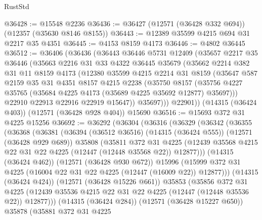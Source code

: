 \begin{lexlean}{RustStd}
\begin{coremodule}
@36428 := @15548 @2236
@36436 := @36427 (@12571 (@36428 @332 @694)) (@12357 (@35630 @8146 @8155))
@36443 := @12389 @35599 @4215 @694 @31 @2217 @35 @4351
@36445 := @4153 @8159 @4173
@36446 := @4802 @36445
@36512 := @36406
    (@36436
      (@36443
        @36446
        @5731
        @12409
        (@35657
          @2217
          @35
          @36446
          (@35663
            @2216
            @31
            @33
            @4322
            @36445
            @35679
            (@35662
              @2214
              @382
              @31
              @11
              @8159
              @4173
              (@12380
                @35599
                @4215
                @2214
                @31
                @8159
                (@35647
                  @587
                  @2159
                  @35
                  @31
                  @4351
                  @8157
                  @4215
                  @2238
                  (@35750
                    @8157
                    (@35756 @4227 @35765 (@35684 @4225 @4173 (@35689 @4225 @35692 @12877) @35697)))
                  @22910
                  @22913
                  @22916
                  @22919
                  @15647))
              @35697)))
        @22901))
    (@14315 (@36424 @403))
    (@12571 (@36428 @928 @404))
    @15690
@36516 := @15693 @372 @31 @4225 @15256
@36692 := @36292
    (@36304
      (@36316
        (@36329
          (@36342
            (@36355
              (@36368
                (@36381
                  (@36394
                    (@36512 @36516)
                    (@14315 (@36424 @555))
                    (@12571 (@36428 @929 @689))
                    @35808
                    (@35811
                      @372
                      @31
                      @4225
                      (@12439 @35568 @4215 @22 @31 @22 @4225 (@12447 (@12448 @35568 @22)) @12877)))
                  (@14315 (@36424 @462))
                  (@12571 (@36428 @930 @672))
                  @15996
                  (@15999 @372 @31 @4225 (@16004 @22 @31 @22 @4225 (@12447 (@16009 @22)) @12877)))
                (@14315 (@36424 @424))
                (@12571 (@36428 @15226 @661))
                @35853
                (@35856
                  @372
                  @31
                  @4225
                  (@12439 @35536 @4215 @22 @31 @22 @4225 (@12447 (@12448 @35536 @22)) @12877)))
              (@14315 (@36424 @284))
              (@12571 (@36428 @15227 @650))
              @35878
              (@35881
                @372
                @31
                @4225

\end{coremodule}
\end{lexlean}

